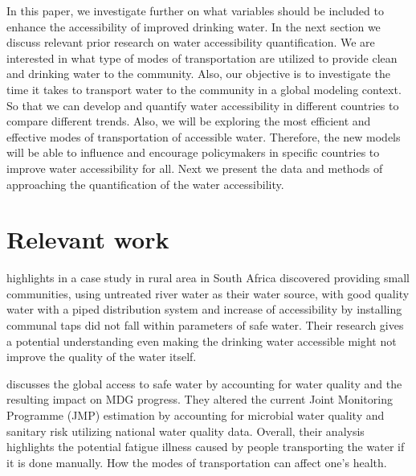 \documentclass[10pt,twoside]{article}
\numberwithin{equation}{section}
\newcommand{\?}{\stackrel{?}{=}}
\newcommand{\rd}{\color{red}}
\begin{document}


In this paper, we investigate further on what
variables should be included to enhance the accessibility of improved drinking water.
In the next section we discuss relevant prior research on water accessibility quantification. We are interested in what type of modes of
transportation are utilized to provide clean and drinking water to the community. Also, our objective is to investigate
the time it takes to transport water to the community in a global modeling context. So that we can develop and quantify
water accessibility in different countries to compare different trends. Also, we will be exploring the most efficient
and effective modes of transportation of accessible water. Therefore, the new models will be able to influence and
encourage policymakers in specific countries to improve water accessibility for all. Next we present the data and methods of approaching the quantification of the water accessibility. 
 
\section{Relevant work}

\citet{jagals2006does} highlights in a case study in rural area in South Africa discovered providing small
communities, using untreated river water as their water source, with good quality water with a piped distribution system
and increase of accessibility by installing communal taps did not fall within parameters of safe water. Their research
gives a potential understanding even making the drinking water accessible might not improve the quality of the water
itself.

\citet{onda2012global} discusses the global access to safe water by accounting for water quality and the resulting
impact on MDG progress. They altered the current Joint Monitoring Programme (JMP) estimation by accounting for microbial
water quality and sanitary risk utilizing national water quality data. 
Overall, their analysis highlights the potential fatigue illness caused by people transporting the water if it is done manually. How the
modes of transportation can affect one's health.
\end{document}
